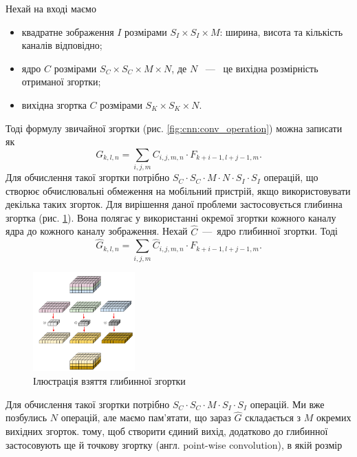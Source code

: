 Нехай на вході маємо
\begin{itemize}
    \item квадратне зображення $I$ розмірами $S_I \times S_I \times M$: ширина, висота та
          кількість каналів відповідно;
    \item ядро $C$ розмірами $S_C \times S_C \times M \times N$, де $N$ ~---~ це вихідна розмірність
          отриманої згортки;
    \item вихідна згортка $C$ розмірами $S_K \times S_K \times N$.
\end{itemize}
Тоді формулу звичайної згортки (рис. \ref{fig:cnn:conv_operation}) можна записати як
\begin{equation*}
    G_{k,l,n} = \sum_{i,j,m} C_{i,j,m,n} \cdot  F_{k+i-1, l+j-1,m}.
\end{equation*}
Для обчислення такої згортки потрібно $S_C \cdot  S_C \cdot  M \cdot  N \cdot  S_I \cdot  S_I$ операцій, що
створює обчислювальні обмеження на мобільний пристрій, якщо використовувати
декілька таких згорток.
Для вирішення даної проблеми застосовується глибинна згортка (рис. \ref{fig:cnn:deep_wise_conv}).
Вона полягає у використанні окремої згортки кожного каналу ядра до кожного каналу
зображення.
Нехай $\widehat{C}$~---~ядро глибинної згортки. Тоді
\begin{equation}
    \widehat{G}_{k,l,n} = \sum_{i,j,m} \widehat{C}_{i,j,m,n} \cdot  F_{k+i-1, l+j-1,m}.
\end{equation}
\begin{figure}[H]
    \centering
    \includegraphics[width=0.35\textwidth]{images/cnn_deep_wise_conv}
    \caption{Ілюстрація взяття глибинної згортки  \cite{deep_wise_sep_conv_website}
        \label{fig:cnn:deep_wise_conv}
    }
\end{figure}
Для обчислення такої згортки потрібно  $S_C \cdot  S_C \cdot  M \cdot  S_I \cdot  S_I$ операцій. Ми вже
позбулись $N$ операцій, але маємо пам'ятати, що
зараз $\widehat{G}$ складається з $M$ окремих вихідних згорток.
тому, щоб створити єдиний вихід, додатково до глибинної застосовують ще
й точкову згортку (англ. point-wise convolution), в якій розмір
